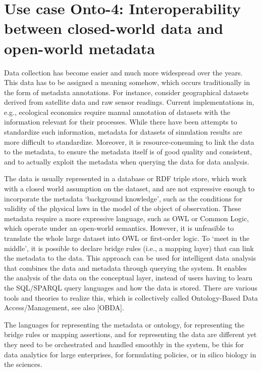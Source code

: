 \documentclass[10pt,%
\ifpretendfinal
final%
\else
draft%
\fi,
]{scrreprt}
\begin{document}
\section{Use case Onto-4: Interoperability between closed-world data and open-world metadata}
Data collection has become easier and much more widespread over the years. This data has to be assigned a meaning somehow, which occurs traditionally in the 
form of metadata annotations. For instance, consider geographical datasets derived from satellite data and raw sensor readings. Current implementations in, e.g., 
ecological economics require manual annotation of datasets with the information relevant for their processes. While there have been attempts to standardize such 
information, metadata for datasets of simulation results are more difficult to standardize. Moreover, it is resource-consuming to link the data to the metadata, to 
ensure the metadata itself is of good quality and consistent, and to actually exploit the metadata when querying the data for data analysis. 

The data is usually represented in a database or RDF triple store, which work with a closed world assumption on the dataset, and are not expressive enough to 
incorporate the metadata `background knowledge', such as the conditions for validity of the physical laws in the model of the object of observation. These metadata 
require a more expressive language, such as OWL or Common Logic, which operate under an open-world semantics. However, it is unfeasible to translate the 
whole large dataset into OWL or first-order logic. To `meet in the middle', it is possible to declare bridge rules (i.e., a mapping layer) that can link the metadata to 
the data. This approach can be used for intelligent data analysis that combines the data and metadata through querying the system. It enables the analysis of the 
data on the conceptual layer, instead of users having to learn the SQL/SPARQL query languages and how the data is stored. There are various tools and theories 
to realize this, which is collectively called Ontology-Based Data Access/Management, see also [OBDA].

The languages for representing the metadata or ontology, for representing the bridge rules or mapping assertions, and for representing the data are different yet 
they need to be orchestrated and handled smoothly in the system, be this for data analytics for large enterprises, for formulating policies, or in silico biology in the 
sciences. 
\end{document}
